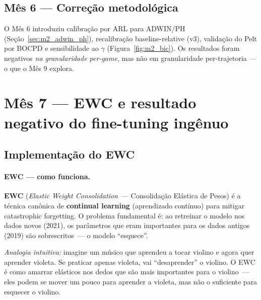 \documentclass[11pt,a4paper]{article}
\begin{document}
\subsection{M\^es 6 --- Corre\c{c}\~ao metodol\'ogica}

O M\^es 6 introduziu calibra\c{c}\~ao por ARL para ADWIN/PH
(Se\c{c}\~ao~\ref{sec:m2_adwin_ph}), recalibra\c{c}\~ao baseline-relative
(v3), valida\c{c}\~ao do Pelt por BOCPD e sensibilidade ao $\gamma$
(Figura~\ref{fig:m2_bic}). Os resultados foram negativos
\emph{na granularidade per-game}, mas n\~ao em granularidade
per-trajetoria --- o que o M\^es 9 explora.

\section{M\^es 7 --- EWC e resultado negativo do fine-tuning ing\^enuo}
\label{sec:ewc}

\subsection{Implementa\c{c}\~ao do EWC}

\paragraph{EWC --- como funciona.}
\textbf{EWC} (\emph{Elastic Weight Consolidation}~--- Consolida\c{c}\~ao El\'astica de Pesos) \cite{kirkpatrick2017} \'e a t\'ecnica can\^onica de \textbf{continual learning} (aprendizado cont\'inuo) para mitigar catastrophic forgetting. O problema fundamental \'e: ao retreinar o modelo nos dados novos (2021), os par\^ametros que eram importantes para os dados antigos (2019) s\~ao sobrescritos~--- o modelo ``esquece''.

\emph{Analogia intuitiva:} imagine um m\'usico que aprendeu a tocar violino e agora quer aprender violeta. Se praticar apenas violeta, vai ``desaprender'' o violino. O EWC \'e como amarrar el\'asticos nos dedos que s\~ao mais importantes para o violino~--- eles podem se mover um pouco para aprender a violeta, mas n\~ao o suficiente para esquecer o violino.
\end{document}
